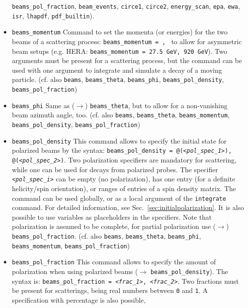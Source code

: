 \documentclass[12pt]{book}
\newcommand{\ttt}[1]{\texttt{#1}}
\begin{document}
\begin{itemize}
\ttt{beams\_pol\_fraction}, \ttt{beam\_events}, \ttt{circe1},
\ttt{circe2}, \ttt{energy\_scan}, \ttt{epa}, \ttt{ewa}, \ttt{isr},
\ttt{lhapdf}, \ttt{pdf\_builtin}). 
\item
\ttt{beams\_momentum} \newline
Command to set the momenta (or energies) for the two beams of a
scattering process: \ttt{beams\_momentum = {\em <mom1>}, {\em <mom2>}} to allow 
for asymmetric beam setups (e.g. HERA: \ttt{beams\_momentum = 27.5
  GeV, 920 GeV}). Two arguments must be present 
for a scattering process, but the command can be used with one
argument to integrate and simulate a decay of a moving
particle. (cf. also \ttt{beams}, \ttt{beams\_theta},
\ttt{beams\_phi}, \ttt{beams\_pol\_density},
\ttt{beams\_pol\_fraction})
\item
\ttt{beams\_phi} \newline
Same as ($\to$) \ttt{beams\_theta}, but to allow for a non-vanishing
beam azimuth angle, too. (cf. also \ttt{beams}, \ttt{beams\_theta},
\ttt{beams\_momentum}, \ttt{beams\_pol\_density},
\ttt{beams\_pol\_fraction})
\item
\ttt{beams\_pol\_density} \newline
This command allows to specify the initial state for polarized beams
by the syntax: \ttt{beams\_pol\_density = @({\em <pol\_spec\_1>}),
  @({\em <pol\_spec\_2>})}. Two polarization specifiers are mandatory for
scattering, while one can be used for decays from polarized
probes. The specifier \ttt{{\em <pol\_spec\_i>}} can be empty (no
polarization), has one entry (for a definite helicity/spin
orientation), or ranges of entries of a spin density matrix. The
command can be used globally, or as a local argument of the
\ttt{integrate} command. For detailed information, see
Sec.~\ref{sec:initialpolarization}. It is also possible to use
variables as placeholders in the specifiers. Note that polarization is
assumed to be complete, for partial polarization use ($\to$)
\ttt{beams\_pol\_fraction}. (cf. also \ttt{beams}, \ttt{beams\_theta},
\ttt{beams\_phi}, \ttt{beams\_momentum}, \ttt{beams\_pol\_fraction})
\item
\ttt{beams\_pol\_fraction} \newline
This command allows to specify the amount of polarization when using
polarized beams ($\to$ \ttt{beams\_pol\_density}). The syntax is:
\ttt{beams\_pol\_fraction = {\em <frac\_1>}, {\em <frac\_2>}}. Two fractions must
be present for scatterings, being real numbers between \ttt{0} and
\ttt{1}. A specification with percentage is also possible,

\end{itemize}
\end{document}
